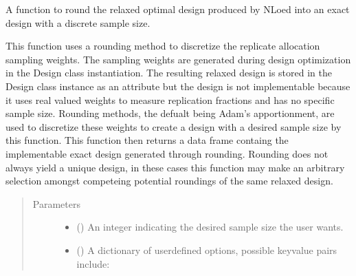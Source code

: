 \documentclass[letterpaper,10pt,english,openany,oneside]{sphinxmanual}
\begin{document}
\begin{fulllineitems}
\begin{fulllineitems}
\begin{quote}
\begin{description}
\end{description}\end{quote}

\end{fulllineitems}


\begin{fulllineitems}
\label{\detokenize{nloed:nloed.design.Design.round}}
A function to round the relaxed optimal design produced by NLoed into an exact design with
a discrete sample size.

This function uses a rounding method to discretize the replicate allocation sampling weights.
The sampling weights are generated during design optimization in the Design class instantiation.
The resulting relaxed design is stored in the Design class instance as an attribute but the
design is not implementable because it uses real valued weights to measure replication fractions
and has no specific sample size. Rounding methods, the defualt being Adam’s apportionment, are
used to discretize these weights to create a design with a desired sample size by this function.
This function then returns a data frame containg the implementable exact design generated through
rounding. Rounding does not always yield a unique design, in these cases this function may
make an arbitrary selection amongst competeing potential roundings of the same relaxed design.
\begin{quote}\begin{description}
\item[{Parameters}] \leavevmode\begin{itemize}
\item {} 
 () \textendash{} An integer indicating the desired sample size the user wants.

\item {} 
 (\sphinxstyleliteralemphasis{\sphinxupquote{, }}) \textendash{} A dictionary of user\sphinxhyphen{}defined options, possible key\sphinxhyphen{}value
pairs include:


\end{itemize}
\end{description}
\end{quote}
\end{fulllineitems}
\end{fulllineitems}
\end{document}
